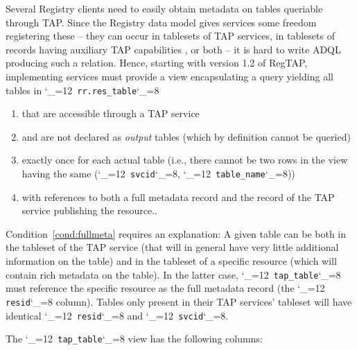 \documentclass[11pt,a4paper]{ivoa}
\makeatletter
\def\rtent#1{\texttt{\color{rtcolor}\verb|#1|}}
\def\makeunderscoreletter{\catcode`\_=12}
\def\makeunderscoresubscript{\catcode`\_=8}
\def\rtent{\makeunderscoreletter\relax\rt@nt}
\def\rt@nt#1{\texttt{\color{rtcolor} #1}\makeunderscoresubscript{}}
\makeatother
\begin{document}
Several Registry clients need to easily obtain metadata on tables
queriable through TAP.  Since the Registry data model gives services
some freedom registering these -- they can occur in tablesets of TAP
services, in tablesets of records having auxiliary TAP capabilities
\citep{2019ivoa.spec.0520D}, or both -- it is hard to write ADQL
producing such a relation.  Hence, starting with version 1.2 of RegTAP,
implementing
services must provide a view encapsulating a query yielding all tables
in \rtent{rr.res_table}

\begin{enumerate}
\item that are accessible through a TAP service
\item and are not declared as \emph{output} tables (which by definition
cannot be queried)
\item exactly once for each actual table (i.e., there cannot be two rows
in the view having the same (\rtent{svcid}, \rtent{table_name}))
\item with references to both a full metadata record and the record of
the TAP service publishing the resource.\label{cond:fullmeta}.
\end{enumerate}

Condition~\ref{cond:fullmeta} requires an explanation: A given table can
be both in the tableset of the TAP service (that will in general have
very little additional information on the table) and in the tableset of
a specific resource (which will contain rich metadata on the table).  In
the latter case, \rtent{tap_table} must reference the specific resource
as the full metadata record (the \rtent{resid} column).  Tables only
present in their TAP services' tableset will have identical
\rtent{resid} and \rtent{svcid}.

The \rtent{tap_table} view has the following columns:


\end{document}
